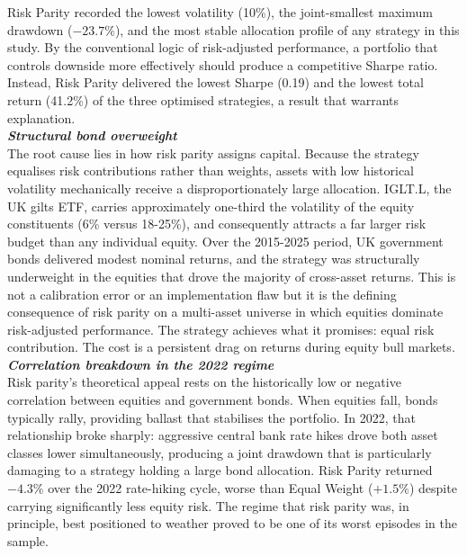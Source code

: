 \documentclass[a4paper,alpha-refs]{scr-contemporary}
\numberwithin{equation}{section}
\begin{document}
\indent \indent Risk Parity recorded the lowest volatility (10\%), the joint-smallest
maximum drawdown ($-23.7\%$), and the most stable allocation profile of any strategy in
this study. By the conventional logic of risk-adjusted performance, a portfolio that
controls downside more effectively should produce a competitive Sharpe ratio. \newline 
\indent Instead,
Risk Parity delivered the lowest Sharpe (0.19) and the lowest total return (41.2\%) of
the three optimised strategies, a result that warrants explanation. \\

\noindent\textbf{\emph{Structural bond overweight}} \\
\indent The root cause lies in how risk parity assigns capital. Because the strategy
equalises risk contributions rather than weights, assets with low historical volatility
mechanically receive a disproportionately large allocation. IGLT.L, the UK gilts ETF,
carries approximately one-third the volatility of the equity constituents (6\% versus
18-25\%), and consequently attracts a far larger risk budget than any individual equity. \newline
\indent Over the 2015-2025 period, UK government bonds delivered modest nominal returns, and the
strategy was structurally underweight in the equities that drove the majority of cross-asset
returns. \newline
\indent This is not a calibration error or an implementation flaw but it is the defining
consequence of risk parity on a multi-asset universe in which equities dominate risk-adjusted
performance. The strategy achieves what it promises: equal risk contribution. The cost is a
persistent drag on returns during equity bull markets. \\

\noindent\textbf{\emph{Correlation breakdown in the 2022 regime}} \\
\indent Risk parity's theoretical appeal rests on the historically low or negative
correlation between equities and government bonds. When equities fall, bonds typically
rally, providing ballast that stabilises the portfolio. \newline 
\indent In 2022, that relationship broke
sharply: aggressive central bank rate hikes drove both asset classes lower simultaneously,
producing a joint drawdown that is particularly damaging to a strategy holding a large
bond allocation. \newline 
\indent Risk Parity returned $-4.3\%$ over the 2022 rate-hiking cycle, worse
than Equal Weight ($+1.5\%$) despite carrying significantly less equity risk. The regime
that risk parity was, in principle, best positioned to weather proved to be one of its
worst episodes in the sample. \\
\end{document}
